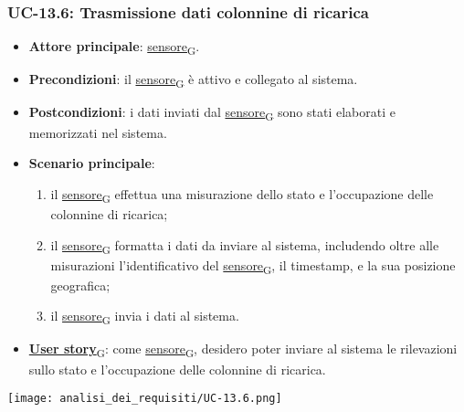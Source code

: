 \newpage

\subsubsection{UC-13.6: Trasmissione dati colonnine di ricarica}
\begin{itemize}
	\item \textbf{Attore principale}: \href{https://7last.github.io/docs/rtb/documentazione-interna/glossario\#sensore}{sensore\textsubscript{G}}.
	\item \textbf{Precondizioni}: il \href{https://7last.github.io/docs/rtb/documentazione-interna/glossario\#sensore}{sensore\textsubscript{G}} è attivo e collegato al sistema.
	\item \textbf{Postcondizioni}: i dati inviati dal \href{https://7last.github.io/docs/rtb/documentazione-interna/glossario\#sensore}{sensore\textsubscript{G}} sono stati elaborati e memorizzati nel sistema.
	\item \textbf{Scenario principale}:
	      \begin{enumerate}
		      \item il \href{https://7last.github.io/docs/rtb/documentazione-interna/glossario\#sensore}{sensore\textsubscript{G}} effettua una misurazione dello stato e l'occupazione delle colonnine di ricarica;
		      \item il \href{https://7last.github.io/docs/rtb/documentazione-interna/glossario\#sensore}{sensore\textsubscript{G}} formatta i dati da inviare al sistema, includendo oltre alle misurazioni l'identificativo del \href{https://7last.github.io/docs/rtb/documentazione-interna/glossario\#sensore}{sensore\textsubscript{G}},
		            il timestamp, e la sua posizione geografica;
		      \item il \href{https://7last.github.io/docs/rtb/documentazione-interna/glossario\#sensore}{sensore\textsubscript{G}} invia i dati al sistema.
	      \end{enumerate}
	\item \href{https://7last.github.io/docs/rtb/documentazione-interna/glossario\#user-story}{\textbf{User story}\textsubscript{G}}: come \href{https://7last.github.io/docs/rtb/documentazione-interna/glossario\#sensore}{sensore\textsubscript{G}}, desidero poter inviare al sistema le rilevazioni sullo stato e l'occupazione delle colonnine di ricarica.
\end{itemize}
\begin{center}
	\texttt{[image: analisi\_dei\_requisiti/UC-13.6.png]}
\end{center}

